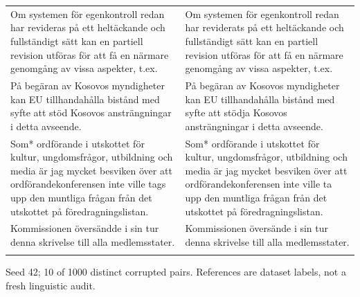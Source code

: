 \documentclass[10pt]{article}
\begin{document}
{\begin{tabular}{@{}>{\raggedright\arraybackslash}p{}@{\hspace{0.04\textwidth}}>{\raggedright\arraybackslash}p{}@{}}
Om systemen för egenkontroll redan har revideras på ett heltäckande och fullständigt sätt kan en partiell revision utföras för att få en närmare genomgång av vissa aspekter, t.ex. & Om systemen för egenkontroll redan har reviderats på ett heltäckande och fullständigt sätt kan en partiell revision utföras för att få en närmare genomgång av vissa aspekter, t.ex. \\ \addlinespace[5pt]
På begäran av Kosovos myndigheter kan EU tillhandahålla bistånd med syfte att stöd Kosovos ansträngningar i detta avseende. & På begäran av Kosovos myndigheter kan EU tillhandahålla bistånd med syfte att stödja Kosovos ansträngningar i detta avseende. \\ \addlinespace[5pt]
Som* ordförande i utskottet för kultur, ungdomsfrågor, utbildning och media är jag mycket besviken över att ordförandekonferensen inte ville tags upp den muntliga frågan från det utskottet på föredragningslistan. & Som* ordförande i utskottet för kultur, ungdomsfrågor, utbildning och media är jag mycket besviken över att ordförandekonferensen inte ville ta upp den muntliga frågan från det utskottet på föredragningslistan. \\ \addlinespace[5pt]
Kommissionen översändde i sin tur denna skrivelse till alla medlemsstater. & Kommissionen översände i sin tur denna skrivelse till alla medlemsstater. \\ \addlinespace[5pt]
\bottomrule\end{tabular}}%
\ifdim\dimexpr\ht\pairtable+\dp\pairtable\relax>0.82\textheight%
\resizebox*{!}{0.82\textheight}{\usebox{\pairtable}}%
\else\usebox{\pairtable}\fi%
\par\smallskip\footnotesize Seed 42; 10 of 1000 distinct corrupted pairs. References are dataset labels, not a fresh linguistic audit.\normalsize
\clearpage
\end{document}
